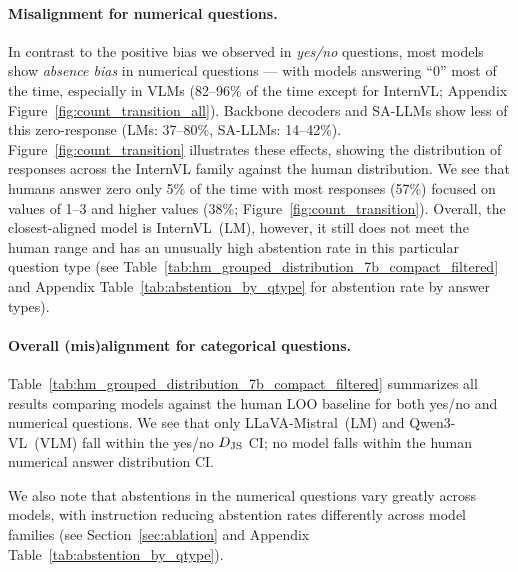 \documentclass[letterpaper]{article}
\begin{document}
\paragraph{Misalignment for numerical questions.} 
In contrast to the positive bias we observed in \textit{yes/no} questions, most models show \textit{absence bias} in numerical questions --- with models answering ``0'' most of the time, especially in VLMs (82--96\% of the time except for InternVL; Appendix Figure~\ref{fig:count_transition_all}). 
Backbone decoders and SA-LLMs show less of this zero-response (LMs: 37--80\%, SA-LLMs: 14--42\%). Figure~\ref{fig:count_transition} illustrates these effects, showing the distribution of responses across the InternVL family against the human distribution.
We see that humans answer zero only 5\% of the time with most responses (57\%) focused on values of 1--3 and higher values (38\%; Figure~\ref{fig:count_transition}).
Overall, the closest-aligned model is InternVL~(LM), however, it still does not meet the human range and  has an unusually high abstention rate in this particular question type (see Table~\ref{tab:hm_grouped_distribution_7b_compact_filtered} and Appendix Table~\ref{tab:abstention_by_qtype} for abstention rate by answer types).

\paragraph{Overall (mis)alignment for categorical questions.}Table~\ref{tab:hm_grouped_distribution_7b_compact_filtered} summarizes all results comparing models against the human LOO baseline for both yes/no and numerical questions.
We see that only LLaVA-Mistral~(LM) and Qwen3-VL~(VLM) fall within the yes/no $\djs$ CI; no model falls within the human numerical answer distribution CI.

We also note that abstentions in the numerical questions vary greatly across models, with instruction reducing abstention rates differently across model families (see Section~\ref{sec:ablation} and Appendix Table~\ref{tab:abstention_by_qtype}).
\end{document}
